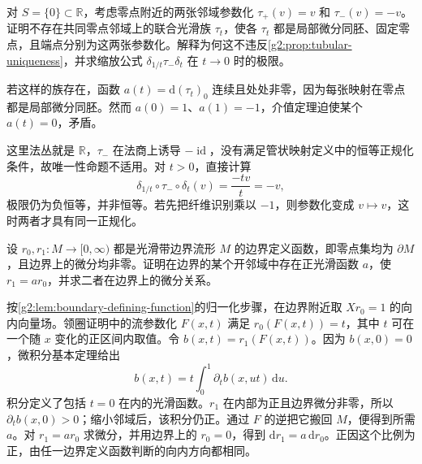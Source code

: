 \begin{exercise}\label{g2:ex:tubular-normalization-sign}
	对 \(S=\{0\}\subset\mathbb R\)，考虑零点附近的两张邻域参数化 \(\tau_+(v)=v\) 和 \(\tau_-(v)=-v\)。证明不存在共同零点邻域上的联合光滑族 \(\tau_t\)，使各 \(\tau_t\) 都是局部微分同胚、固定零点，且端点分别为这两张参数化。解释为何这不违反\cref{g2:prop:tubular-uniqueness}，并求缩放公式 \(\delta_{1/t}\tau_-\delta_t\) 在 \(t\to0\) 时的极限。
\end{exercise}
\begin{solution}
	若这样的族存在，函数 \(a(t)=\mathrm{d}(\tau_t)_0\) 连续且处处非零，因为每张映射在零点都是局部微分同胚。然而 \(a(0)=1\)、\(a(1)=-1\)，介值定理迫使某个 \(a(t)=0\)，矛盾。

	这里法丛就是 \(\mathbb R\)，\(\tau_-\) 在法商上诱导 \(-\operatorname{id}\)，没有满足管状映射定义中的恒等正规化条件，故唯一性命题不适用。对 \(t>0\)，直接计算
	\[
		\delta_{1/t}\circ\tau_-\circ\delta_t(v)=\frac{-tv}{t}=-v,
	\]
	极限仍为负恒等，并非恒等。若先把纤维识别乘以 \(-1\)，则参数化变成 \(v\mapsto v\)，这时两者才具有同一正规化。
\end{solution}

\begin{exercise}\label{g2:ex:boundary-functions-ratio}
	设 \(r_0,r_1:M\to[0,\infty)\) 都是光滑带边界流形 \(M\) 的边界定义函数，即零点集均为 \(\partial M\)，且边界上的微分均非零。证明在边界的某个开邻域中存在正光滑函数 \(a\)，使 \(r_1=ar_0\)，并求二者在边界上的微分关系。
\end{exercise}
\begin{solution}
	按\cref{g2:lem:boundary-defining-function}的归一化步骤，在边界附近取 \(Xr_0=1\) 的向内向量场。领圈证明中的流参数化 \(F(x,t)\) 满足 \(r_0(F(x,t))=t\)，其中 \(t\) 可在一个随 \(x\) 变化的正区间内取值。令 \(b(x,t)=r_1(F(x,t))\)。因为 \(b(x,0)=0\)，微积分基本定理给出
	\[
		b(x,t)=t\int_0^1\partial_tb(x,ut)\,\mathrm{d}u.
	\]
	积分定义了包括 \(t=0\) 在内的光滑函数。\(r_1\) 在内部为正且边界微分非零，所以 \(\partial_tb(x,0)>0\)；缩小邻域后，该积分仍正。通过 \(F\) 的逆把它搬回 \(M\)，便得到所需 \(a\)。对 \(r_1=ar_0\) 求微分，并用边界上的 \(r_0=0\)，得到 \(\mathrm{d}r_1=a\,\mathrm{d}r_0\)。正因这个比例为正，由任一边界定义函数判断的向内方向都相同。
\end{solution}

